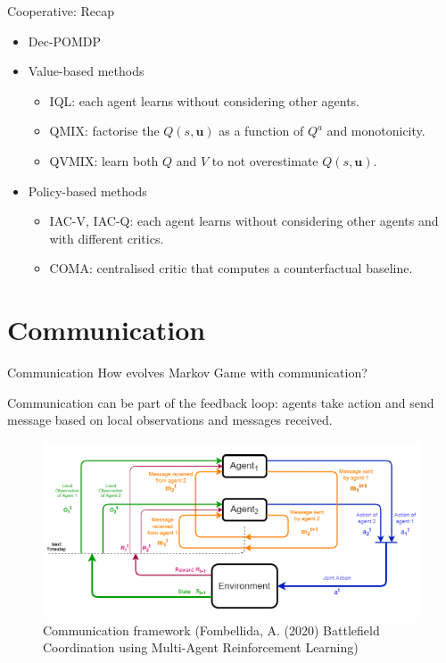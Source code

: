 \documentclass{beamer}
\begin{document}
\begin{frame}{Cooperative: Recap}
\begin{itemize}
    \item Dec-POMDP
    \vfill
    \item Value-based methods
        \begin{itemize}
        \item IQL: each agent learns without considering other agents.
        \item QMIX: factorise the $Q(s,\bm{u})$ as a function of $Q^a$ and monotonicity.
        \item QVMIX: learn both $Q$ and $V$ to not overestimate $Q(s,\bm{u})$.
        \end{itemize}{}
    \vfill
    \item Policy-based methods
        \begin{itemize}
        \item IAC-V, IAC-Q: each agent learns without considering other agents and with different critics.
        \item COMA: centralised critic that computes a counterfactual baseline.
        \end{itemize}{}
    \vfill
\end{itemize}{}
\end{frame}


\begin{frame}[plain]{}
\end{frame}



\section{Communication}
\begin{frame}{Communication}
How evolves Markov Game with communication?

Communication can be part of the feedback loop: agents take action and send message based on local observations and messages received. 

\begin{figure}
    \centering
    \includegraphics[scale=0.45]{com_scheme_1.png}
    \caption{Communication framework (Fombellida, A. (2020) Battlefield Coordination using Multi-Agent Reinforcement Learning)}
\end{figure}
\end{frame}
\end{document}
